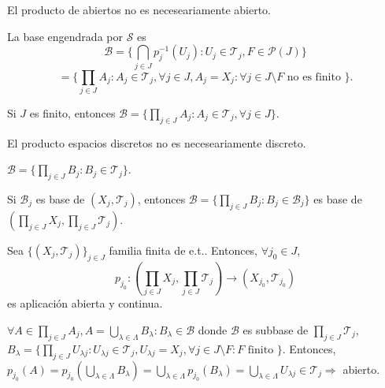\begin{obs}
  El producto de abiertos no es neceseariamente abierto.
\end{obs}

\begin{obs}
La base engendrada por $\mathcal{S}$ es 
\[ 
  \mathcal{B} = \big\{ \bigcap_{j \in J} p_{j}^{-1}(U_{j}) : U_{j} \in \mathcal{T}_{j}, F \in \mathcal{P}(J) \big\}
\]
\[ 
  = \big\{  \prod_{j \in J} A_{j} : A_{j} \in \mathcal{T}_{j}, \forall j \in J, A_{j} = X_{j} : \forall j \in J \setminus F \text{ no es finito } \big\}.
\] 
\end{obs}

\begin{obs}
  Si $J$ es finito, entonces $ \mathcal{B} = \big\{ \prod_{j \in J} A_{j}: A_{j} \in \mathcal{T}_{j}, \forall j \in J \big\}$.
\end{obs}

\begin{obs}
  El producto espacios discretos no es neceseariamente discreto.
\end{obs}

\begin{obs}
  $\mathcal{B} = \{  \prod_{j \in J} B_{j} : B_{j} \in \mathcal{T}_{j}\}$.
\end{obs}

\begin{obs}
  Si $\mathcal{B}_{j}$ es base de $( X_{j}, \mathcal{T}_{j} )$, entonces $\mathcal{B} = \{ \prod_{j \in J} B_{j} : B_{j} \in \mathcal{B}_{j} \}$ es base de $( \prod_{j \in J} X_{j}, \prod_{j \in J} \mathcal{T}_{j} )$.
\end{obs}

\begin{prop}
  Sea $\{( X_{j}, \mathcal{T}_{j} )\}_{j \in J}$ familia finita de e.t.. Entonces, $\forall j_{0} \in J$, 
  \[ 
    p_{j_{0}}: ( \prod_{j \in J} X_{j}, \prod_{j \in J} \mathcal{T}_{j} ) \to ( X_{j_{0}}, \mathcal{T}_{j_{0}} )
  \] 
  es aplicación abierta y continua.
\end{prop}

\begin{dem}
  $\forall A \in \prod_{j \in J} A_{j}, A = \bigcup_{\lambda \in \Lambda} B_{\lambda} : B_{\lambda} \in \mathcal{B}$ donde $\mathcal{B}$ es subbase de $\prod_{j \in J} \mathcal{T}_{j}$, $B_{\lambda} = \{ \prod_{j \in J} U_{\lambda j}: U_{\lambda j} \in \mathcal{T}_{j}, U_{\lambda j} = X_{j}, \forall j \in J \setminus F: F \text{ finito }\}$. Entonces, $p_{j_{0}}(A) = p_{j_{0}}(\bigcup_{\lambda \in \Lambda} B_{\lambda}) = \bigcup_{\lambda \in \Lambda} p_{j_{0}}(B_{\lambda}) = \bigcup_{\lambda \in \Lambda} U_{\lambda j} \in \mathcal{T}_{j} \Rightarrow $ abierto.
\end{dem}

